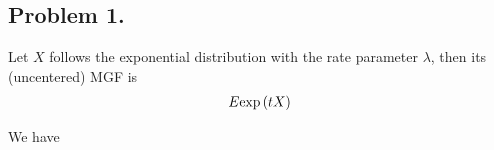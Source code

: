

\subsection*{Problem 1.}

Let $X$ follows the exponential distribution with the rate parameter $\lambda$, then its (uncentered) MGF is
\begin{align*}
  E{\exp \del{tX}}
\end{align*}


We have

  



